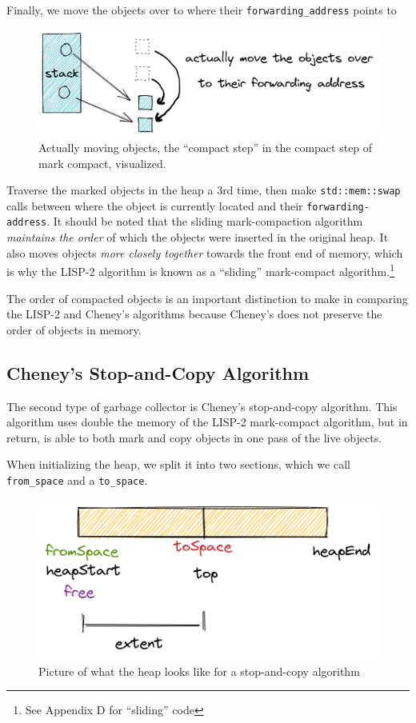 \documentclass[index]{subfiles}
\begin{document}
Finally, we move the objects over to where their \verb+forwarding_address+ points to

\begin{figure}[H]
    \centering
    \includegraphics[scale=0.25]{pics/actually-move.png}
    \caption{Actually moving objects, the ``compact step'' in the compact step of mark compact, visualized.}
\end{figure}

Traverse the marked objects in the heap a 3rd time, then make \texttt{std::mem::swap} calls between where the object is currently located and their \verb+forwarding-address+. It should be noted that the sliding mark-compaction algorithm \textit{maintains the order} of which the objects were inserted in the original heap. It also moves objects \textit{more closely together} towards the front end of memory, which is why the LISP-2 algorithm is known as a ``sliding'' mark-compact algorithm.\footnote{See Appendix D for ``sliding'' code}

The order of compacted objects is an important distinction to make in comparing the LISP-2 and Cheney's algorithms because Cheney's does not preserve the order of objects in memory.

\subsection{Cheney's Stop-and-Copy Algorithm}

The second type of garbage collector is Cheney's stop-and-copy algorithm. This algorithm uses double the memory of the LISP-2 mark-compact algorithm, but in return, is able to both mark and copy objects in one pass of the live objects.

When initializing the heap, we split it into two sections, which we call \verb+from_space+ and a \verb+to_space+\cite[Chapter~2]{gc_handbook}.

\begin{figure}[H]
    \centering
    \includegraphics[scale=0.3]{pics/split-heap-diagram.png}
    \caption{Picture of what the heap looks like for a stop-and-copy algorithm}
\end{figure}
\end{document}

